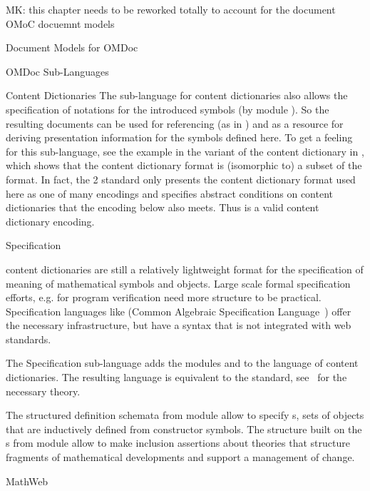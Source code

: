 \begin{oldpart}{MK: this chapter needs to be reworked totally to account for the document
    OMoC docuemnt models}
\begin{tchapter}[id=document-model]{Document Models for OMDoc}
\begin{tsection}[id=sub-languages]{OMDoc Sub-Languages}
\begin{tsubsection}[id=sub-languages:cd]{{\omdoc} Content Dictionaries}
  The sub-language for {\omdoc} content dictionaries also allows the specification of
  notations for the introduced symbols (by module {}). So the resulting
  documents can be used for referencing (as in {\openmath}) and as a resource for deriving
  presentation information for the symbols defined here.  To get a feeling for this
  sub-language, see the example in the {\omdoc} variant of the {\openmath} content
  dictionary {} in {}, which shows that the {\openmath}
  content dictionary format is (isomorphic to) a subset of the {\omdoc} format. In fact,
  the {\openmath}2 standard only presents the content dictionary format used here as one
  of many encodings and specifies abstract conditions on content dictionaries that the
  {\omdoc} encoding below also meets.  Thus {\omdoc} is a valid content dictionary
  encoding.
\end{tsubsection}

\begin{tsubsection}[id=sub-languages:spec]{Specification {\omdoc}}
 
  {\omdoc} content dictionaries are still a relatively lightweight format for the
  specification of meaning of mathematical symbols and objects. Large scale formal
  specification efforts, e.g. for program verification need more structure to be
  practical. Specification languages like {\casl} (Common Algebraic
  Specification Language~\cite{CoFI:2004:CASL-RM}) offer the
  necessary infrastructure, but have a syntax that is not integrated with web standards.

  The Specification {\omdoc} sub-language adds the modules {} and
  {} to the language of {\omdoc} content dictionaries. The resulting
  language is equivalent to the {\casl} standard,
  see~\cite{AutHut:tefsduc00,Hutter:mocsv00,MAH-06-a} for the necessary theory.

The structured definition schemata from module {} allow to specify
{s}, sets of objects that are inductively defined from
constructor symbols. The {} structure built on the
{s} from module {} allow to make inclusion
assertions about theories that structure fragments of mathematical developments and
support a management of change.
\end{tsubsection}

\begin{tsubsection}[id=sub-languages:mathwebomdoc]{MathWeb {\omdoc}}


\end{tsubsection}
\end{tsection}
\end{tchapter}
\end{oldpart}
